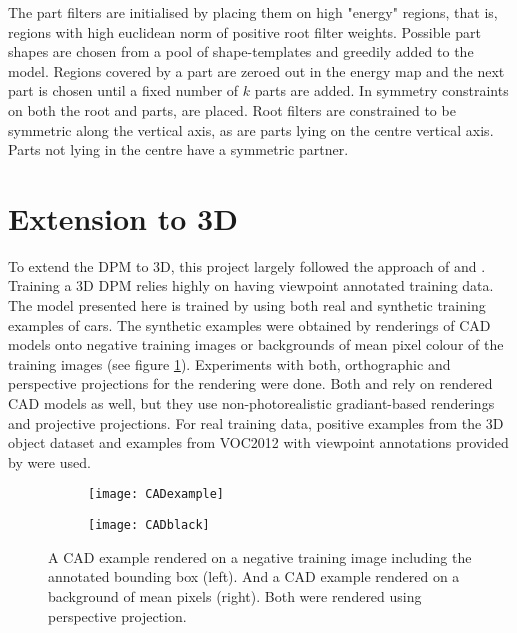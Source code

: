 The part filters are initialised by placing them on high "energy" regions, that is, regions with high euclidean norm of positive root filter weights. Possible part shapes are chosen from a pool of shape-templates and greedily added to the model. Regions covered by a part are zeroed out in the energy map and the next part is chosen until a fixed number of $k$ parts are added. In \cite{5255236} symmetry constraints on both the root and parts, are placed. Root filters are constrained to be symmetric along the vertical axis, as are parts lying on the centre vertical axis. Parts not lying in the centre have a symmetric partner.


\section{Extension to 3D}\label{sec:ext3D}
To extend the DPM to 3D, this project largely followed the approach of \cite{6248075} and \cite{Pepik:2012aa}. Training a 3D DPM relies highly on having viewpoint annotated training data. The model presented here is trained by using both real and synthetic training examples of cars. The synthetic examples were obtained by renderings of CAD models onto negative training images or backgrounds of mean pixel colour of the training images (see figure \ref{fig:CAD}). Experiments with both, orthographic and perspective projections for the rendering were done. Both \cite{6248075} and \cite{Pepik:2012aa} rely on rendered CAD models as well, but  they use non-photorealistic gradiant-based renderings and projective projections. For real training data, positive examples from the 3D object dataset \cite{4408987} and examples from VOC2012 \cite{pascal-voc-2012} with viewpoint annotations provided by \cite{xiang_wacv14} were used. 

\begin{figure}
\begin{center}
        \begin{subfigure}[b]{0.49\textwidth}
                \texttt{[image: CADexample]}
        \end{subfigure}
        \begin{subfigure}[b]{0.49\textwidth}
               \texttt{[image: CADblack]}
        \end{subfigure}
\caption{A CAD example rendered on a negative training image including the annotated bounding box (left). And a CAD example rendered on a background of mean pixels (right). Both were rendered using perspective projection.}
\label{fig:CAD}
\end{center}
\end{figure}


